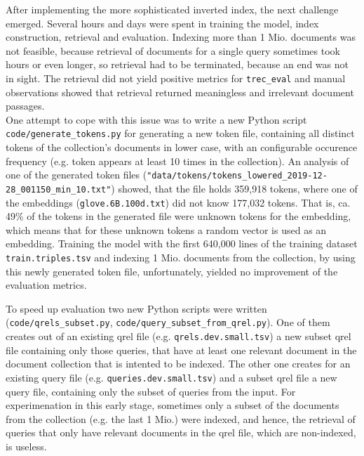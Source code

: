 After implementing the more sophisticated inverted index, the next challenge emerged.
Several hours and days were spent in training the model, index construction, retrieval and evaluation.
Indexing more than 1 Mio. documents was not feasible, because retrieval of documents for a single query sometimes took hours or 
    even longer, so retrieval had to be terminated, because an end was not in sight.
The retrieval did not yield positive metrics for \verb|trec_eval| and manual observations showed that retrieval returned meaningless    
    and irrelevant document passages.\\
One attempt to cope with this issue was to write a new Python script \verb|code/generate_tokens.py| for generating a new token file, 
    containing all distinct tokens of the collection's documents in lower case, with an configurable occurence frequency 
    (e.g. token appears at least 10 times in the collection).
An analysis of one of the generated token files (\verb|"data/tokens/tokens_lowered_2019-12-28_001150_min_10.txt"|) showed,
    that the file holds 359,918 tokens, where one of the embeddings (\verb|glove.6B.100d.txt|) did not know 177,032 tokens.
That is, ca. 49\% of the tokens in the generated file were unknown tokens for the embedding,
    which means that for these unknown tokens a random vector is used as an embedding.
Training the model with the first 640,000 lines of the training dataset \verb|train.triples.tsv| and
    indexing 1 Mio. documents from the collection,
    by using this newly generated token file, unfortunately, yielded no improvement of the evaluation
    metrics.

To speed up evaluation two new Python scripts were written
    (\verb|code/qrels_subset.py|, \verb|code/query_subset_from_qrel.py|).
One of them creates out of an existing qrel file (e.g. \verb|qrels.dev.small.tsv|)
    a new subset qrel file containing only those queries, that have at least one 
    relevant document in the document collection that is intented to be indexed.
The other one creates for an existing query file (e.g. \verb|queries.dev.small.tsv|)
    and a subset qrel file a new query file, containing only the subset of queries from the input.
For experimenation in this early stage, sometimes only a subset of the documents from the 
    collection (e.g. the last 1 Mio.) were indexed, and hence, 
    the retrieval of queries that only have relevant documents in the qrel file, which are non-indexed,
    is useless.

